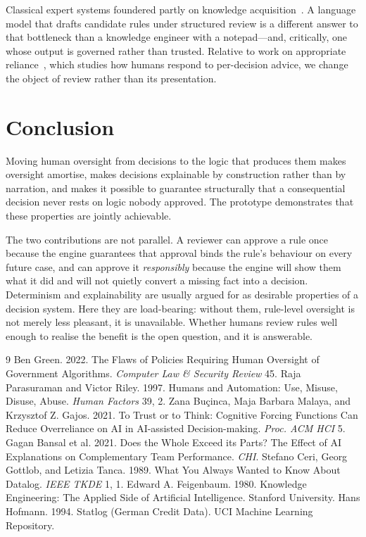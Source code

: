 \documentclass[sigconf,nonacm]{acmart}
\begin{document}
Classical expert systems foundered partly on knowledge
acquisition~\cite{feigenbaum1980}. A language model that drafts candidate rules
under structured review is a different answer to that bottleneck than a
knowledge engineer with a notepad---and, critically, one whose output is
governed rather than trusted. Relative to work on appropriate
reliance~\cite{bucinca2021,bansal2021}, which studies how humans respond to
per-decision advice, we change the object of review rather than its presentation.

\section{Conclusion}

Moving human oversight from decisions to the logic that produces them makes
oversight amortise, makes decisions explainable by construction rather than by
narration, and makes it possible to guarantee structurally that a consequential
decision never rests on logic nobody approved. The prototype demonstrates that
these properties are jointly achievable.

The two contributions are not parallel. A reviewer can approve a rule once
because the engine guarantees that approval binds the rule's behaviour on every
future case, and can approve it \emph{responsibly} because the engine will show
them what it did and will not quietly convert a missing fact into a decision.
Determinism and explainability are usually argued for as desirable properties of
a decision system. Here they are load-bearing: without them, rule-level
oversight is not merely less pleasant, it is unavailable. Whether humans review rules well enough
to realise the benefit is the open question, and it is answerable.

\begin{thebibliography}{9}
 Ben Green. 2022. The Flaws of Policies Requiring Human
  Oversight of Government Algorithms. \emph{Computer Law \& Security Review} 45.
 Raja Parasuraman and Victor Riley. 1997. Humans and
  Automation: Use, Misuse, Disuse, Abuse. \emph{Human Factors} 39, 2.
 Zana Bu\c{c}inca, Maja Barbara Malaya, and Krzysztof Z.
  Gajos. 2021. To Trust or to Think: Cognitive Forcing Functions Can Reduce
  Overreliance on AI in AI-assisted Decision-making. \emph{Proc. ACM HCI} 5.
 Gagan Bansal et al. 2021. Does the Whole Exceed its Parts?
  The Effect of AI Explanations on Complementary Team Performance. \emph{CHI}.
 Stefano Ceri, Georg Gottlob, and Letizia Tanca. 1989. What
  You Always Wanted to Know About Datalog. \emph{IEEE TKDE} 1, 1.
 Edward A. Feigenbaum. 1980. Knowledge Engineering: The
  Applied Side of Artificial Intelligence. Stanford University.
 Hans Hofmann. 1994. Statlog (German Credit Data). UCI
  Machine Learning Repository.
\end{thebibliography}
\end{document}
